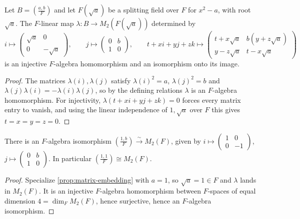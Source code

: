 \begin{proposition}
    \label{prop:matrix-embedding}
    \leanok
    Let $B = \left(\frac{a,b}{F}\right)$ and let $F(\sqrt a)$ be a splitting field
    over $F$ for $x^2 - a$, with root $\sqrt a$. The $F$-linear map
    $\lambda \colon B \to M_2(F(\sqrt a))$ determined by
    \[
      i \mapsto \begin{pmatrix} \sqrt a & 0 \\ 0 & -\sqrt a \end{pmatrix}, \qquad
      j \mapsto \begin{pmatrix} 0 & b \\ 1 & 0 \end{pmatrix}, \qquad
      t + xi + yj + zk \mapsto
      \begin{pmatrix} t + x\sqrt a & b(y + z\sqrt a) \\ y - z\sqrt a & t - x\sqrt a \end{pmatrix}
    \]
    is an injective $F$-algebra homomorphism and an isomorphism onto its image.
\end{proposition}
\begin{proof}
    The matrices $\lambda(i), \lambda(j)$ satisfy $\lambda(i)^2 = a$,
    $\lambda(j)^2 = b$ and $\lambda(j)\lambda(i) = -\lambda(i)\lambda(j)$, so by the
    defining relations $\lambda$ is an $F$-algebra homomorphism. For injectivity,
    $\lambda(t + xi + yj + zk) = 0$ forces every matrix entry to vanish, and using
    the linear independence of $1, \sqrt a$ over $F$ this gives
    $t = x = y = z = 0$.
\end{proof}

\begin{corollary}
    \label{cor:split-matrix}
    \leanok
    There is an $F$-algebra isomorphism
    $\left(\frac{1,b}{F}\right) \xrightarrow{\sim} M_2(F)$, given by
    $i \mapsto \left(\begin{smallmatrix}1 & 0\\ 0 & -1\end{smallmatrix}\right)$,
    $j \mapsto \left(\begin{smallmatrix}0 & b\\ 1 & 0\end{smallmatrix}\right)$.
    In particular $\left(\frac{1,1}{F}\right) \cong M_2(F)$.
\end{corollary}
\begin{proof}
    Specialize \ref{prop:matrix-embedding} with $a = 1$, so $\sqrt a = 1 \in F$ and
    $\lambda$ lands in $M_2(F)$. It is an injective $F$-algebra homomorphism between
    $F$-spaces of equal dimension $4 = \dim_F M_2(F)$, hence surjective, hence an
    $F$-algebra isomorphism.
\end{proof}

